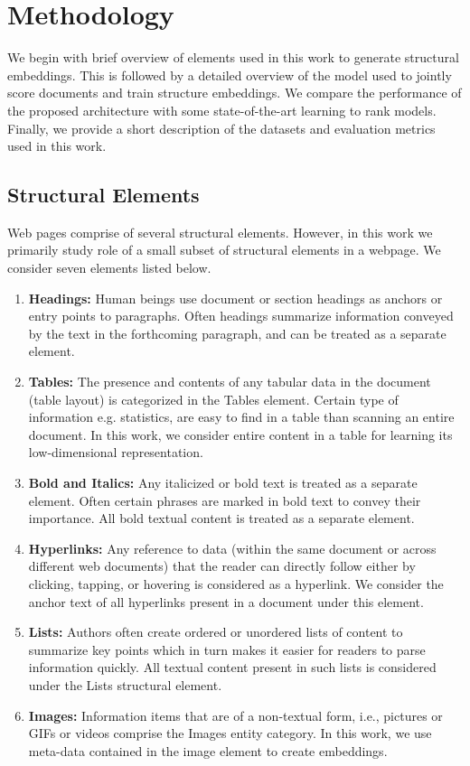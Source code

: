 
\section{Methodology}
\label{sec:methodology}
We begin with brief overview of elements used in this work to generate structural embeddings. 
This is followed by a detailed overview of the model used to jointly score documents and train 
structure embeddings. We compare the performance of the proposed architecture with some 
state-of-the-art learning to rank models. Finally, we provide a short description of the 
datasets and evaluation metrics used in this work.
\subsection{Structural Elements}
Web pages comprise of several structural elements. However, in this work we primarily study 
role of a small subset of structural elements in a webpage. We consider seven elements 
listed below.
\begin{enumerate}
\item \textbf{Headings:} Human beings use document or section headings as anchors 
or entry points \cite{} to paragraphs. Often headings summarize information conveyed by 
the text in the forthcoming paragraph, and can be treated as a separate element. 
\item \textbf{Tables:} The presence and contents of any tabular data in the 
document (table layout) is categorized in the Tables element. Certain type of 
information e.g. statistics, are easy to find in a table than scanning an  
entire document. In this work, we consider entire content in a table for learning 
its low-dimensional representation.
\item \textbf{Bold and Italics:} Any italicized or bold text is treated as a separate element. Often 
certain phrases are marked in bold text to convey their importance. 
All bold textual content is treated as a separate element.
\item \textbf{Hyperlinks:} Any reference to data (within the same document or 
across different web documents) that the reader can directly follow either by 
clicking, tapping, or hovering is considered as a hyperlink. We consider the 
anchor text of all hyperlinks present in a document under this element.
\item \textbf{Lists:} Authors often create ordered or unordered lists of content to summarize key points 
which in turn makes it easier for readers to parse information quickly. All textual 
content present in such lists is considered under the Lists structural element.
\item \textbf{Images:} Information items that are of a non-textual form, i.e., 
pictures or GIFs or videos comprise the Images entity category. In this work, we use meta-data 
contained in the image element to create embeddings. 
\end{enumerate}


